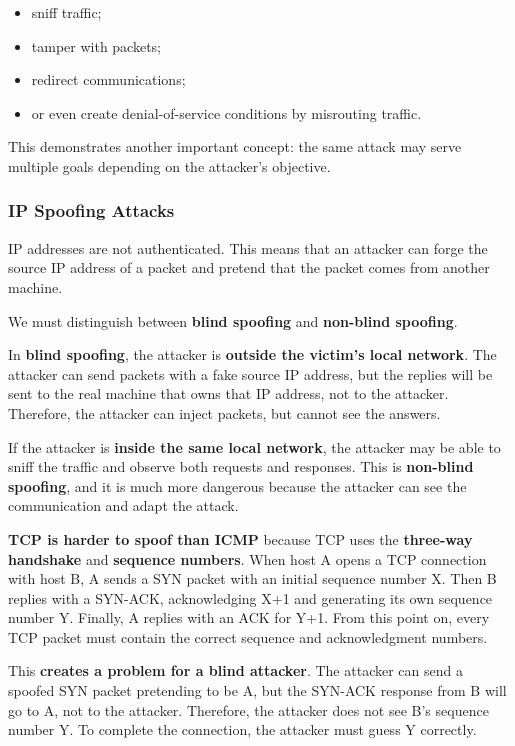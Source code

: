 \documentclass{article}
\begin{document}
\begin{itemize}
\item sniff traffic;
\item tamper with packets;
\item redirect communications;
\item or even create denial-of-service conditions by misrouting traffic.
\end{itemize}

This demonstrates another important concept: the same attack may serve multiple goals depending on the attacker's objective.

\subsubsection{IP Spoofing Attacks}

IP addresses are not authenticated. This means that an attacker can forge the source IP address of a packet and pretend that the packet comes from another machine.

We must distinguish between \textbf{blind spoofing} and \textbf{non-blind spoofing}.

In \textbf{blind spoofing}, the attacker is \textbf{outside the victim's local network}. The attacker can send packets with a fake source IP address, but the replies will be sent to the real machine that owns that IP address, not to the attacker. Therefore, the attacker can inject packets, but cannot see the answers.

If the attacker is \textbf{inside the same local network}, the attacker may be able to sniff the traffic and observe both requests and responses. This is \textbf{non-blind spoofing}, and it is much more dangerous because the attacker can see the communication and adapt the attack.

\textbf{TCP is harder to spoof than ICMP} because TCP uses the \textbf{three-way handshake} and \textbf{sequence numbers}. When host A opens a TCP connection with host B, A sends a SYN packet with an initial sequence number X. Then B replies with a SYN-ACK, acknowledging X+1 and generating its own sequence number Y. Finally, A replies with an ACK for Y+1. From this point on, every TCP packet must contain the correct sequence and
acknowledgment numbers.

This \textbf{creates a problem for a blind attacker}. The attacker can send a
spoofed SYN packet pretending to be A, but the SYN-ACK response from B
will go to A, not to the attacker. Therefore, the attacker does not see
B's sequence number Y. To complete the connection, the attacker must
guess Y correctly.
\end{document}
